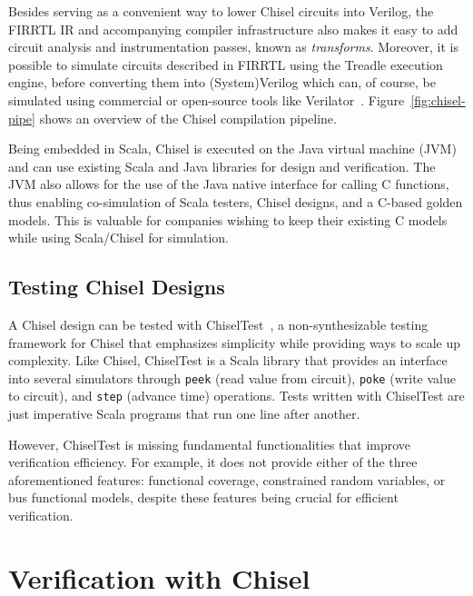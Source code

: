 \documentclass[conference]{IEEEtran}
\begin{document}
Besides serving as a convenient way to lower Chisel circuits into Verilog, the FIRRTL IR and accompanying compiler infrastructure
also makes it easy to add circuit analysis and instrumentation passes, known as \textit{transforms}. Moreover, it is possible to simulate circuits described in FIRRTL using the Treadle execution engine, before converting them into (System)Verilog which can, of course, be simulated using commercial or open-source tools like Verilator~\cite{verilator}. Figure~\ref{fig:chisel-pipe} shows an overview of the Chisel compilation pipeline.

Being embedded in Scala, Chisel is executed on the Java virtual machine (JVM) and can
use existing Scala and Java libraries for design and verification. 
The JVM also allows for the use of the Java native interface for calling C functions, 
thus enabling co-simulation of Scala testers, Chisel designs, and a C-based golden models. This is 
valuable for companies wishing to keep their existing C models while using Scala/Chisel for simulation.

\subsection{Testing Chisel Designs}
A Chisel design can be tested with ChiselTest~\cite{chiseltest}, a non-synthesizable 
testing framework for Chisel that emphasizes simplicity while providing ways to scale up 
complexity. Like Chisel, ChiselTest is a Scala library that provides an interface into several 
simulators through \texttt{peek} (read value from circuit), \texttt{poke} (write value to 
circuit), and \texttt{step} (advance time) operations. Tests written with ChiselTest are just 
imperative Scala programs that run one line after another.

However, ChiselTest is missing fundamental functionalities that improve verification efficiency. 
For example, it does not provide either of the three aforementioned features: functional 
coverage, constrained random variables, or bus functional models, despite these features being 
crucial for efficient verification.

\section{Verification with Chisel}
\label{sec:verify}
\end{document}
